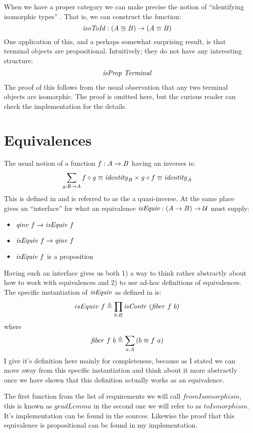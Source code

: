 When we have a proper category we can make precise the notion of ``identifying
isomorphic types'' . That is, we can construct the
function:
%
$$
\mathit{isoToId} \mathrel{:} (A \approxeq B) \to (A \equiv B)
$$
%
One application of this, and a perhaps somewhat surprising result, is that
terminal objects are propositional. Intuitively; they do not
have any interesting structure:
%
\begin{align}
\label{eq:termProp}
\mathit{isProp}\ \mathit{Terminal}
\end{align}
%
The proof of this follows from the usual
observation that any two terminal objects are isomorphic. The proof is omitted
here, but the curious reader can check the implementation for the details.

\section{Equivalences}
\label{sec:equiv}
The usual notion of a function $f \mathrel{:} A \to B$ having an inverses is:
%
$$
\sum_{g \mathrel{:} B \to A} f \circ g \equiv \mathit{identity}_{B} \times g \circ f \equiv \mathit{identity}_{A}
$$
%
This is defined in \cite[p. 129]{hott-2013} and is referred to as the a
quasi-inverse. At the same place \cite{hott-2013} gives an ``interface'' for
what an equivalence $\mathit{isEquiv} \mathrel{:} (A \to B) \to \mathcal{U}$ must supply:
%
\begin{itemize}
\item
  $\qinv\ f \to \isEquiv\ f$
\item
  $\isEquiv\ f \to \qinv\ f$
\item
  $\mathit{isEquiv}\ f$ is a proposition
\end{itemize}
%
Having such an interface gives us both 1) a way to think rather abstractly about
how to work with equivalences and 2) to use ad-hoc definitions of equivalences.
The specific instantiation of $\mathit{isEquiv}$ as defined in \cite{cubical-agda} is:
%
$$
isEquiv\ f \defeq \prod_{b \tp B} \isContr\ (\fiber\ f\ b)
$$
where
$$
\mathit{fiber}\ f\ b \mathrel{\triangleq} \sum_{a \mathrel{:} A} \left( b \equiv f\ a \right)
$$
%
I give it's definition here mainly for completeness, because as I stated we can
move away from this specific instantiation and think about it more abstractly
once we have shown that this definition actually works as an equivalence.

The first function from the list of requirements we will call
$\mathit{fromIsomorphism}$, this is known as $\mathit{gradLemma}$ in
\cite{cubical-agda} the second one we will refer to as $\mathit{toIsmorphism}$. It's
implementation can be found in the sources. Likewise the proof that this
equivalence is propositional can be found in my implementation.

